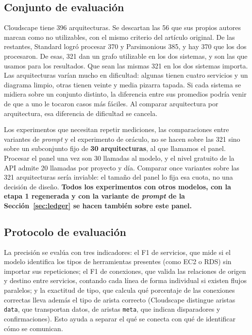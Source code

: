 \documentclass[a4paper, twocolumn, 10pt]{IEEEtran}
\newcommand{\nuevo}[1]{{\bfseries #1}}
\begin{document}
\subsection{Conjunto de evaluación}
Cloudscape tiene 396 arquitecturas. Se descartan las 56 que sus propios autores marcan como no utilizables, con el mismo criterio del artículo original. De las restantes, Standard logró procesar 370 y Parsimonious 385, y hay 370 que los dos procesaron. De esas, 321 dan un grafo utilizable en los dos sistemas, y son las que usamos para los resultados. Que sean las mismas 321 en los dos sistemas importa. Las arquitecturas varían mucho en dificultad: algunas tienen cuatro servicios y un diagrama limpio, otras tienen veinte y media pizarra tapada. Si cada sistema se midiera sobre un conjunto distinto, la diferencia entre sus promedios podría venir de que a uno le tocaron casos más fáciles. Al comparar arquitectura por arquitectura, esa diferencia de dificultad se cancela.
 
Los experimentos que necesitan repetir mediciones, las comparaciones entre variantes de \emph{prompt} y el experimento de oráculo, no se hacen sobre las 321 sino sobre un subconjunto fijo de \textbf{30 arquitecturas}, al que llamamos el panel. Procesar el panel una vez son 30 llamadas al modelo, y el nivel gratuito de la API admite 20 llamadas por proyecto y día. Comparar once variantes sobre las 321 arquitecturas sería inviable: el tamaño del panel lo fija esa cuota, no una decisión de diseño. \nuevo{Todos los
experimentos con otros modelos, con la etapa 1 regenerada y con la variante de
\emph{prompt} de la Sección~\ref{sec:ledger} se hacen también sobre este panel.}
 
\subsection{Protocolo de evaluación}
La precisión se evalúa con tres indicadores: el F1 de servicios, que mide si el modelo identifica los tipos de herramientas presentes (como EC2 o RDS) sin importar sus repeticiones; el F1 de conexiones, que valida las relaciones de origen y destino entre servicios, contando cada línea de forma individual si existen flujos paralelos; y la exactitud de tipo, que calcula qué porcentaje de las conexiones correctas lleva además el tipo de arista correcto (Cloudscape distingue aristas \texttt{data}, que transportan datos, de aristas \texttt{meta}, que indican disparadores y confirmaciones). Esto ayuda a separar el qué se conecta con qué de identificar cómo se comunican.
 
\end{document}
